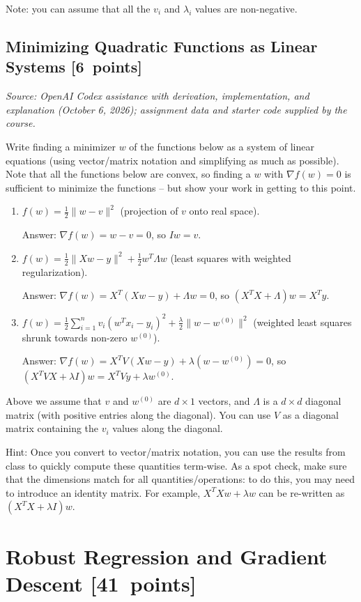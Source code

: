 \documentclass{article}
\newcommand{\blu}[1]{{\textcolor{blu}{#1}}}
\newcommand{\gre}[1]{\textcolor{gre}{#1}}
\newcommand\ans[1]{\par\gre{Answer: #1}}
\let\ask\blu
\newcommand\pts[1]{\textcolor{pointscolour}{[#1~points]}}
\newcommand{\norm}[1]{\lVert #1 \rVert}
\begin{document}
Note: you can assume that all the $v_i$ and $\lambda_i$ values are non-negative.

\subsection{Minimizing Quadratic Functions as Linear Systems \pts{6}} \label{sec:lin-sys}
\par\textit{Source: OpenAI Codex assistance with derivation, implementation, and explanation (October 6, 2026); assignment data and starter code supplied by the course.}\par


\ask{Write finding a minimizer $w$ of the functions below as a system of linear equations} (using vector/matrix notation and simplifying as much as possible). Note that all the functions below are convex, so finding a $w$ with $\nabla f(w) = 0$ is sufficient to minimize the functions -- but show your work in getting to this point.

\begin{enumerate}

\item $f(w) = \frac{1}{2} \norm{w-v}^2$ (projection of $v$ onto real space).
\ans{$\nabla f(w)=w-v=0$, so $Iw=v$.}
\item $f(w)= \frac{1}{2} \norm{Xw - y}^2 + \frac{1}{2} w^T\Lambda w$ (least squares with weighted regularization).
\ans{$\nabla f(w)=X^T(Xw-y)+\Lambda w=0$, so $(X^TX+\Lambda)w=X^Ty$.}
\item $f(w) = \frac{1}{2} \sum_{i=1}^n v_i (w^Tx_i - y_i)^2 + \frac{\lambda}{2}\norm{w-w^{(0)}}^2$ (weighted least squares shrunk towards non-zero $w^{(0)}$). \label{item:weighted-shrunk-ls}
\ans{$\nabla f(w)=X^TV(Xw-y)+\lambda(w-w^{(0)})=0$, so $(X^TVX+\lambda I)w=X^TVy+\lambda w^{(0)}$.}
\end{enumerate}
Above we assume that $v$ and $w^{(0)}$ are $d \times 1$ vectors, and $\Lambda$ is a $d \times d$ diagonal matrix (with positive entries along the diagonal). You can use $V$ as a diagonal matrix containing the $v_i$ values along the diagonal.

Hint: Once you convert to vector/matrix notation, you can use the results from class to quickly compute these quantities term-wise.
As a spot check, make sure that the dimensions match for all quantities/operations: to do this, you may need to introduce an identity matrix. For example, $X^T X w + \lambda w$ can be re-written as $(X^T X + \lambda I)w$.


\clearpage
\section{Robust Regression and Gradient Descent \pts{41}}
\end{document}
